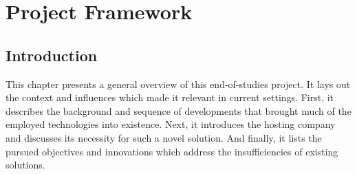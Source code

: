 \chapter{Project Framework}

\section{Introduction}
This chapter presents a general overview of this end-of-studies project. It lays out the context and influences which made it relevant in current settings.
First, it describes the background and sequence of developments that brought much of the employed technologies into existence. Next, it introduces the hosting company and discusses its necessity for such a novel solution. And finally, it lists the pursued objectives and innovations which address the insufficiencies of existing solutions.

